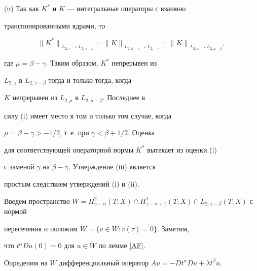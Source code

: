 \begin{pf}
(ii) Так как $K^*$ и $K$ --- интегральные операторы с взаимно


транспонированными ядрами, то


$$


{\|K^*\|}_{L_{2,\gamma} \to L_{2,\gamma-\beta}} = {\|K\|}_{L_{2,\beta-\gamma}


\to  L_{2,-\gamma}} = {\|K\|}_{L_{2,\mu} \to L_{2,\mu-\beta}},


$$


где $\mu=\beta-\gamma$. Таким образом, $K^*$ непрерывен из


$L_{2,\gamma}$ в $L_{2,\gamma-\beta}$ тогда и только тогда, когда


$K$ непрерывен из $L_{2,\mu}$ в $L_{2,\mu-\beta}$. Последнее в


силу (i) имеет место в том и только том случае, когда


$\mu=\beta-\gamma > -1/2$, т.\,е. при $\gamma < \beta+1/2$. Оценка


для соответствующей операторной нормы $K^*$ вытекает из оценки (i)


с заменой $\gamma$ на $\beta-\gamma$. Утверждение (iii) является


простым следствием утверждений (i) и (ii).


\end{pf}





Введем пространство $W=H^2_{\gamma-\alpha}(T;X) \cap


H^1_{\gamma-\alpha+1}(T;X) \cap L_{2,\gamma-\beta}(T;X)$ с нормой


пересечения и положим $\Dot{W}=\{v \in W: v(\tau)=0\}$. Заметим,


что  $t^\alpha Du(0)=0$ для $u \in \Dot{W}$ по лемме \ref{AF}.


Определим на $\Dot W$ дифференциальный оператор $A u= -D t^\alpha


Du + \lambda t^\beta u$.








